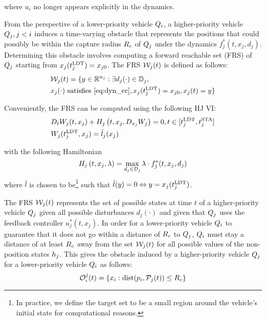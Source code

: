 \noindent where $u_i$ no longer appears explicitly in the dynamics.

From the perspective of a lower-priority vehicle $Q_i$, a higher-priority vehicle $Q_j, j < i$ induces a time-varying obstacle that represents the positions that could possibly be within the capture radius $R_c$ of $Q_j$ under the dynamics $f^*_j(t, x_j, d_j)$. Determining this obstacle involves computing a forward reachable set (FRS) of $Q_j$ starting from $x_j(t^\text{LDT}_j) = x_{j0}$. The FRS $\mathcal{W}_j(t)$ is defined as follows:
\vspace{-0.3em}
\begin{equation}
\label{eq:FRS1}
\begin{aligned}
&\frs_j(t) = \{y \in \R^{n_j}: \exists d_j(\cdot) \in \dfset_j, \\
&x_j(\cdot) \text{ satisfies \eqref{eq:dyn_cc}}, x_j(\ldt_j) = x_{j0}, x_j(t) = y\}
\end{aligned}
\end{equation}

Conveniently, the FRS can be computed using the following HJ VI:
\vspace{-0.4em}
\begin{equation}
\label{eq:FRS_HJIVI}
\begin{aligned}
&D_t W_j(t, x_j) + H_j\left(t, x_j, D_{x_j} W_j\right) = 0, t \in [\ldt_j, \sta_j]\\
&W_j(\ldt_j, x_j) = \bar l_j(x_j) \\
\end{aligned}
\end{equation}

\noindent with the following Hamiltonian
\begin{equation}
H_j\left(t, x_j, \lambda\right) = \max_{d_j \in \mathcal{D}_j} \lambda \cdot f^*_j(t, x_j, d_j)
\end{equation}
\noindent where $\bar l$ is chosen to be\footnote{In practice, we define the target set to be a small region around the vehicle's initial state for computational reasons.} such that $\bar l (y) = 0 \Leftrightarrow y = x_j(t^\text{LDT}_j)$.

The FRS $\mathcal{W}_j(t)$ represents the set of possible states at time $t$ of a higher-priority vehicle $Q_j$ given all possible disturbances $d_j(\cdot)$ and given that $Q_j$ uses the feedback controller $u_j^*(t, x_j)$. In order for a lower-priority vehicle $Q_i$ to guarantee that it does not go within a distance of $R_c$ to $Q_j$, $Q_i$ must stay a distance of at least $R_c$ away from the set $\mathcal{W}_j(t)$ for all possible values of the non-position states $h_j$. This gives the obstacle induced by a higher-priority vehicle $Q_j$ for a lower-priority vehicle $Q_i$ as follows:
\vspace{-0.4em}
\begin{equation}
\mathcal{O}_i^j(t) = \{x_i: \text{dist}(p_i, \mathcal{P}_j(t)) \le R_c \}
\end{equation}

